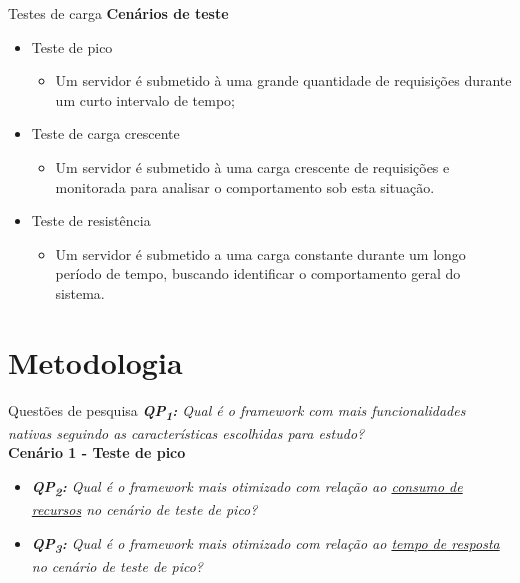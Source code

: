 \documentclass{libs/ufc_format}
\begin{document}
\begin{frame}{Testes de carga}
    \textbf{Cenários de teste}\nocite{7123673}\let\thefootnote\relax{}
    \begin{itemize}
        \item Teste de pico
            \begin{itemize}
                \item Um servidor é submetido à uma grande quantidade de requisições durante um curto intervalo de tempo;
            \end{itemize}
        \vspace*{0.5em}
        \item Teste de carga crescente
            \begin{itemize}
                \item Um servidor é submetido à uma carga crescente de requisições e monitorada para analisar o comportamento sob esta situação.
            \end{itemize}
        \vspace*{0.5em}
        \item Teste de resistência
            \begin{itemize}
                \item Um servidor é submetido a uma carga constante durante um longo período de tempo, buscando identificar o comportamento geral do sistema.
            \end{itemize}
    \end{itemize}
\end{frame}

\section{Metodologia}
\begin{frame}{Questões de pesquisa}
    \textit{\textbf{QP\textsubscript{1}:} Qual é o \textit{framework} com mais funcionalidades nativas seguindo as características escolhidas para estudo?}\\
    \vspace*{0.5em}
    \textbf{Cenário 1 - Teste de pico}
    \begin{itemize}
        \item \textit{\textbf{QP\textsubscript{2}:} Qual é o \textit{framework} mais otimizado com relação ao \underline{consumo de recursos} no cenário de teste de pico?}
        \vspace*{0.5em}
        \item \textit{\textbf{QP\textsubscript{3}:} Qual é o \textit{framework} mais otimizado com relação ao \underline{tempo de resposta} no cenário de teste de pico?}
    \end{itemize}
\end{frame}
\end{document}
